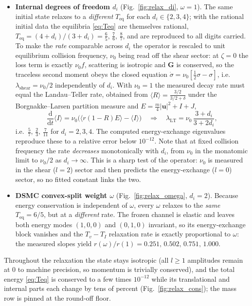 \begin{itemize}
\item \textbf{Internal degrees of freedom $d_i$} (Fig.~\ref{fig:relax_di}, $\omega=1$). The same
initial state relaxes to a \emph{different} $T_{\mathrm{eq}}$ for each $d_i\in\{2,3,4\}$; with the
rational initial data the equilibria \eqref{eq:Teq} are themselves rational,
$T_{\mathrm{eq}}=(4+d_i)/(3+d_i)=\tfrac65,\,\tfrac76,\,\tfrac87$, and are reproduced to all digits
carried. To make the \emph{rate} comparable across $d_i$ the operator is rescaled to unit
equilibrium collision frequency, $\nu_0$ being read off the shear sector: at $\zeta=0$ the loss
term is exactly $\nu_0f$, scattering is isotropic and $\bm G$ is conserved, so the traceless second
moment obeys the closed equation $\dot\sigma=\nu_0[\tfrac12\sigma-\sigma]$, i.e.
$\lambda_{\mathrm{shear}}=\nu_0/2$ independently of $d_i$. With $\nu_0=1$ the measured decay rate
must equal the Landau--Teller rate, obtained from $\langle R\rangle=\tfrac{3/2}{3/2+\delta}$ under
the Borgnakke--Larsen partition measure and $E=\tfrac m4|\bm u|^2+I+J$,
\begin{equation}
  \frac{\mathrm{d}}{\mathrm{d}t}\langle I\rangle=\nu_0\big(\langle r(1-R)E\rangle-\langle I\rangle\big)
  \quad\Longrightarrow\quad
  \lambda_{\mathrm{LT}}=\nu_0\,\frac{3+d_i}{3+2d_i},
  \label{eq:LT}
\end{equation}
i.e.\ $\tfrac57,\,\tfrac23,\,\tfrac7{11}$ for $d_i=2,3,4$. The computed energy-exchange
eigenvalues reproduce these to a relative error below $10^{-12}$. Note that at fixed collision
frequency the rate \emph{decreases} monotonically with $d_i$, from $\nu_0$ in the monatomic limit
to $\nu_0/2$ as $d_i\to\infty$. This is a sharp test of the operator: $\nu_0$ is measured in the
shear ($l=2$) sector and then predicts the energy-exchange ($l=0$) sector, so no fitted constant
links the two.
\item \textbf{DSMC convex-split weight $\omega$} (Fig.~\ref{fig:relax_omega}, $d_i=2$). Because
energy conservation is independent of $\omega$, every $\omega$ relaxes to the \emph{same}
$T_{\mathrm{eq}}=6/5$, but at a \emph{different} rate. The frozen channel is elastic and leaves
both energy modes $(1,0,0)$ and $(0,1,0)$ invariant, so its energy-exchange block vanishes and the
$T_v-T_I$ relaxation rate is exactly proportional to $\omega$: the measured slopes yield
$r(\omega)/r(1)=0.251,\,0.502,\,0.751,\,1.000$.
\end{itemize}

Throughout the relaxation the state stays isotropic (all $l\ge1$ amplitudes remain at $0$ to
machine precision, so momentum is trivially conserved), and the total energy \eqref{eq:Teq} is
conserved to a few times $10^{-12}$ while its translational and internal parts each change by tens of
percent (Fig.~\ref{fig:relax_cons}); the mass row is pinned at the round-off floor.

